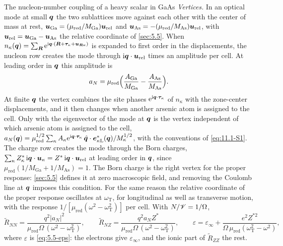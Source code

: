 \begin{workedexample}{The nucleon-number coupling of a heavy scalar in GaAs}
\emph{Vertices.} In an optical mode at small $\bm{q}$ the two sublattices move against each other with the center of mass at rest, $\bm{u}_{\mathrm{Ga}} = (\mu_{\mathrm{red}}/M_{\mathrm{Ga}})\bm{u}_{\mathrm{rel}}$ and $\bm{u}_{\mathrm{As}} = -(\mu_{\mathrm{red}}/M_{\mathrm{As}})\bm{u}_{\mathrm{rel}}$, with $\bm{u}_{\mathrm{rel}} = \bm{u}_{\mathrm{Ga}} - \bm{u}_{\mathrm{As}}$ the relative coordinate of \cref{sec:5.5}. When $n_\kappa(\bm{q}) = \sum_{\bm{R}}\mathrm{e}^{\mathrm{i}\bm{q}\cdot(\bm{R} + \bm{\tau}_\kappa + \bm{u}_{\bm{R}\kappa})}$ is expanded to first order in the displacements, the nucleon row creates the mode through $\mathrm{i}\bm{q}\cdot\bm{u}_{\mathrm{rel}}$ times an amplitude per cell. At leading order in $\bm{q}$ this amplitude is
\begin{equation*}
  a_N = \mu_{\mathrm{red}}\Bigl(\frac{A_{\mathrm{Ga}}}{M_{\mathrm{Ga}}} - \frac{A_{\mathrm{As}}}{M_{\mathrm{As}}}\Bigr) .
\end{equation*}
At finite $\bm{q}$ the vertex combines the site phases $\mathrm{e}^{\mathrm{i}\bm{q}\cdot\bm{\tau}_\kappa}$ of $n_\kappa$ with the zone-center displacements, and it then changes when another arsenic atom is assigned to the cell. Only with the eigenvector of the mode at $\bm{q}$ is the vertex independent of which arsenic atom is assigned to the cell, $a_N(\bm{q}) = \mu_{\mathrm{red}}^{1/2}\sum_\kappa A_\kappa\mathrm{e}^{\mathrm{i}\bm{q}\cdot\bm{\tau}_\kappa}\,\hat{\bm{q}}\cdot\bm{e}^*_{\kappa\mathrm{L}}(\bm{q})/M_\kappa^{1/2}$, with the conventions of \cref{eq:11.1-S1}.
The charge row creates the mode through the Born charges, $\sum_\kappa Z^*_\kappa\,\mathrm{i}\bm{q}\cdot\bm{u}_\kappa = Z^*\,\mathrm{i}\bm{q}\cdot\bm{u}_{\mathrm{rel}}$ at leading order in $\bm{q}$, since $\mu_{\mathrm{red}}(1/M_{\mathrm{Ga}} + 1/M_{\mathrm{As}}) = 1$. The Born charge is the right vertex for the proper response: \cref{sec:5.5} defines it at zero macroscopic field, and removing the Coulomb line at $\bm{q}$ imposes this condition. For the same reason the relative coordinate of the proper response oscillates at $\omega_{\mathrm{T}}$, for longitudinal as well as transverse motion, with the response $1/[\mu_{\mathrm{red}}(\omega^2 - \omega_{\mathrm{T}}^2)]$ per cell. With $N/\mathscr{V} = 1/\Omega$,
\begin{equation*}
  \tilde R_{NN} = \frac{q^2|a_N|^2}{\mu_{\mathrm{red}}\Omega\,(\omega^2 - \omega_{\mathrm{T}}^2)} , \qquad
  \tilde R_{NZ} = \frac{q^2a_NZ^*}{\mu_{\mathrm{red}}\Omega\,(\omega^2 - \omega_{\mathrm{T}}^2)} , \qquad
  \varepsilon = \varepsilon_\infty + \frac{e^2Z^{*2}}{\Omega\,\mu_{\mathrm{red}}(\omega_{\mathrm{T}}^2 - \omega^2)} ,
\end{equation*}
where $\varepsilon$ is \cref{eq:5.5-eps}: the electrons give $\varepsilon_\infty$, and the ionic part of $\tilde R_{ZZ}$ the rest.


\end{workedexample}
